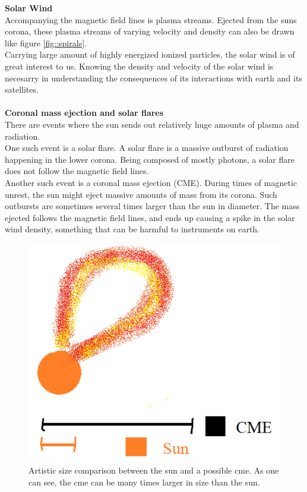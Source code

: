 \documentclass[norsk,a4paper,12pt]{article}
\begin{document}
\begin{multicols}{2}
		\textbf{Solar Wind}\\
		Accompanying the magnetic field lines is plasma streams. Ejected from the suns corona, these plasma streams of varying velocity and density can also                         		be drawn like figure \ref{fig::spirals}.\\
		Carrying large amount of highly energized ionized particles, the solar wind is of great interest to us. Knowing the density and velocity of the solar wind 				is necesarry in understanding the consequences of its interactions with earth and its satellites.\\
		\\
		\textbf{Coronal mass ejection and solar flares}\\
		There are events where the sun sends out relatively huge amounts of plasma and radiation.\\
		One such event is a solar flare. A solar flare is a massive outburst of radiation happening in the lower corona. Being composed of mostly photons, a 				solar flare does not follow the magnetic field lines.\\
		Another such event is a coronal mass ejection (CME). During times of magnetic unrest, the sun might eject massive amounts of mass from its corona. 				Such outbursts are sometimes several times larger than the sun in diameter. The mass ejected follows the magnetic field lines, and ends up causing a 		spike in the solar wind density, something that can be harmful to instruments on earth.
		\begin{figure}[H]
			\includegraphics[scale = 0.7]{Figures/artistic_cme.png}
			\centering
			\caption{Artistic size comparison between the sun and a possible cme. As one can see, the cme can be many times larger in size than the sun.}
			\label{fig::cme}
		\end{figure}


\end{multicols}
\end{document}
